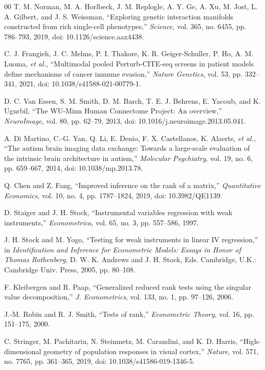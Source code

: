 \documentclass[journal,twoside,web]{ieeecolor}
\begin{document}
\begin{thebibliography}{00}
T. M. Norman, M. A. Horlbeck, J. M. Replogle, A. Y. Ge, A. Xu, M. Jost,
L. A. Gilbert, and J. S. Weissman, ``Exploring genetic interaction manifolds
constructed from rich single-cell phenotypes,'' \emph{Science}, vol. 365,
no. 6455, pp. 786--793, 2019, doi: 10.1126/science.aax4438.

C. J. Frangieh, J. C. Melms, P. I. Thakore, K. R. Geiger-Schuller, P. Ho,
A. M. Luoma, \emph{et al.}, ``Multimodal pooled Perturb-CITE-seq screens in
patient models define mechanisms of cancer immune evasion,'' \emph{Nature
Genetics}, vol. 53, pp. 332--341, 2021, doi: 10.1038/s41588-021-00779-1.

D. C. Van Essen, S. M. Smith, D. M. Barch, T. E. J. Behrens, E. Yacoub, and
K. Ugurbil, ``The WU-Minn Human Connectome Project: An overview,''
\emph{NeuroImage}, vol. 80, pp. 62--79, 2013,
doi: 10.1016/j.neuroimage.2013.05.041.

A. Di Martino, C.-G. Yan, Q. Li, E. Denio, F. X. Castellanos, K. Alaerts,
\emph{et al.}, ``The autism brain imaging data exchange: Towards a large-scale
evaluation of the intrinsic brain architecture in autism,'' \emph{Molecular
Psychiatry}, vol. 19, no. 6, pp. 659--667, 2014, doi: 10.1038/mp.2013.78.

Q. Chen and Z. Fang, ``Improved inference on the rank of a matrix,''
\emph{Quantitative Economics}, vol. 10, no. 4, pp. 1787--1824, 2019,
doi: 10.3982/QE1139.

D. Staiger and J. H. Stock, ``Instrumental variables regression with weak
instruments,'' \emph{Econometrica}, vol. 65, no. 3, pp. 557--586, 1997.

J. H. Stock and M. Yogo, ``Testing for weak instruments in linear IV
regression,'' in \emph{Identification and Inference for Econometric Models:
Essays in Honor of Thomas Rothenberg}, D. W. K. Andrews and J. H. Stock, Eds.
Cambridge, U.K.: Cambridge Univ. Press, 2005, pp. 80--108.

F. Kleibergen and R. Paap, ``Generalized reduced rank tests using the singular
value decomposition,'' \emph{J. Econometrics}, vol. 133, no. 1, pp. 97--126,
2006.

J.-M. Robin and R. J. Smith, ``Tests of rank,'' \emph{Econometric Theory},
vol. 16, pp. 151--175, 2000.

C. Stringer, M. Pachitariu, N. Steinmetz, M. Carandini, and K. D. Harris,
``High-dimensional geometry of population responses in visual cortex,''
\emph{Nature}, vol. 571, no. 7765, pp. 361--365, 2019,
doi: 10.1038/s41586-019-1346-5.


\end{thebibliography}
\end{document}
